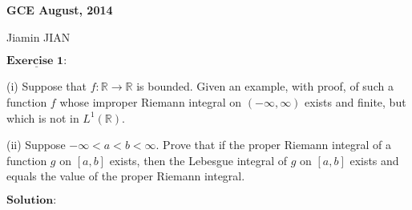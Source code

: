 \documentclass[12pt,a4paper]{ctexart}
\begin{document}
\begin{center}
\textbf{ GCE August, 2014}
\vspace{8pt}

Jiamin JIAN
\end{center}

\vspace{12pt}

$\underline{\textbf{Exercise 1:}}$

(i) Suppose that $f: \mathbb{R} \to \mathbb{R}$ is bounded. Given an example, with proof, of such a function $f$ whose improper Riemann integral on $(-\infty, \infty)$ exists and finite, but which is not in $L^{1}(\mathbb{R})$.

\vspace{4pt}

(ii) Suppose $- \infty < a < b < \infty$. Prove that if the proper Riemann integral of a function $g$ on $[a, b]$ exists, then the Lebesgue integral of $g$ on $[a, b]$ exists and equals the value of the proper Riemann integral.

\vspace{8pt}

$\textbf{Solution:}$
\end{document}
